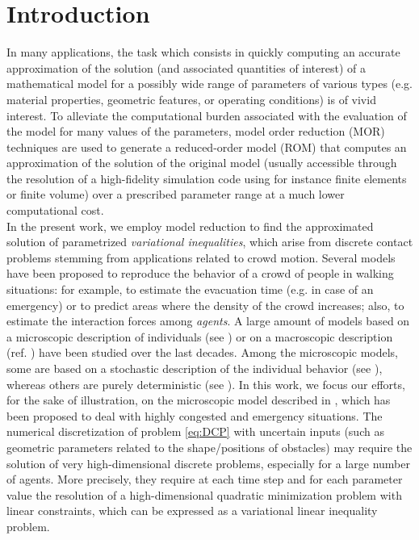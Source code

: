 \section{Introduction}
\label{sec:model}
 In many applications, the task which consists in quickly computing an accurate approximation of the solution (and associated quantities of interest) of a mathematical model for a possibly wide range of parameters of various types (e.g. material properties, geometric features, or operating conditions) is of vivid interest. To alleviate the computational burden associated with the evaluation of the model for many values of the parameters, model order reduction (MOR) techniques are used to generate a reduced-order model (ROM) that computes an approximation of the solution of the original model (usually accessible through the resolution of a high-fidelity simulation code using for instance finite elements or finite volume) over a prescribed parameter range at a much lower computational cost.\\
In the present work, we employ model reduction to find the approximated solution of parametrized \emph{variational inequalities}, which arise from discrete contact problems stemming from applications related to crowd motion. Several models have been proposed to reproduce the behavior of a crowd of people in walking situations: for example, to estimate the evacuation time (e.g. in case of an emergency) or to predict areas where the density of the crowd increases; also, to estimate the interaction forces among \emph{agents}.
A large amount of models based on a microscopic description of individuals (see  \cite{helbing1995social,borgers1986city,borgers1986model}) 
or on a macroscopic description (ref. \cite{hughes2000flow,hughes2002continuum,maury2010macroscopic,santambrogio2018crowd}) have been studied over the last decades.
Among the microscopic models, some are based on a stochastic description of the individual behavior (see \cite{henderson1971statistics}), whereas others are purely deterministic (see \cite{maury2011discrete,hoogendoorn2004dynamic,hoogendoorn2004pedestrian}). In this work, we focus our efforts, for the sake of illustration, on the microscopic model described in \cite{maury2011discrete}, which has been proposed to deal with highly congested and emergency situations. 
The numerical discretization of problem \eqref{eq:DCP} with uncertain inputs (such as geometric parameters related to the shape/positions of obstacles) may require the solution of very high-dimensional discrete problems, especially for a large number of agents. More precisely, they require at each time step and for each parameter value the resolution of a high-dimensional quadratic minimization problem with linear constraints, which can be expressed as a variational linear inequality problem. \\

